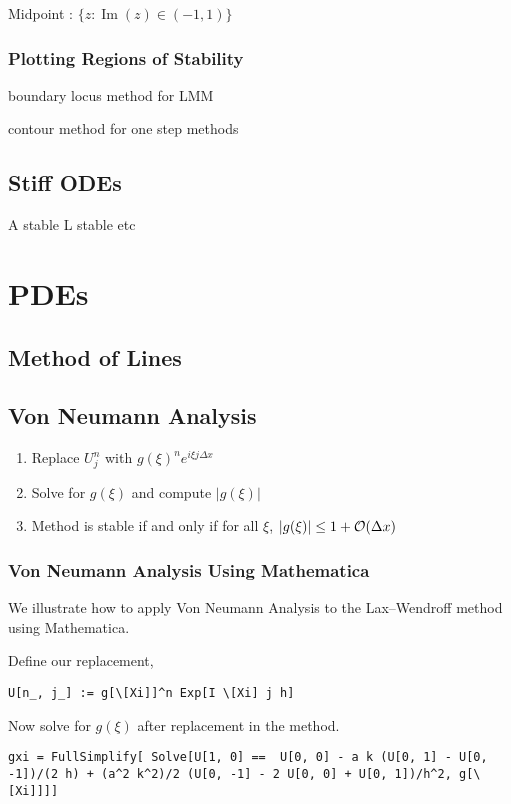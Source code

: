 \documentclass[12pt]{article}
\begin{document}
Midpoint : \( \{ z : \operatorname{Im}(z) \in (-1,1) \} \)


\subsubsection{Plotting Regions of Stability}

boundary locus method for LMM

contour method for one step methods

\subsection{Stiff ODEs}

A stable L stable etc

\section{PDEs}
\subsection{Method of Lines}

\subsection{Von Neumann Analysis}

\begin{enumerate}[nolistsep]
    \item Replace \( U_j^n \) with \( g(\xi)^n e^{i\xi j \Delta x} \)
    \item Solve for \( g(\xi) \) and compute \( |g(\xi)| \)
    \item Method is stable if and only if for all \( \xi \), \( |g(\xi)| \leq 1+\mathcal{O}(\Delta x) \)
\end{enumerate}


\subsubsection{Von Neumann Analysis Using Mathematica}
We illustrate how to apply Von Neumann Analysis to the Lax--Wendroff method using Mathematica.

Define our replacement,
\begin{lstlisting}
U[n_, j_] := g[\[Xi]]^n Exp[I \[Xi] j h]
\end{lstlisting}

Now solve for \( g(\xi) \) after replacement in the method.
\begin{lstlisting}
gxi = FullSimplify[ Solve[U[1, 0] ==  U[0, 0] - a k (U[0, 1] - U[0, -1])/(2 h) + (a^2 k^2)/2 (U[0, -1] - 2 U[0, 0] + U[0, 1])/h^2, g[\[Xi]]]]
\end{lstlisting}
\end{document}
